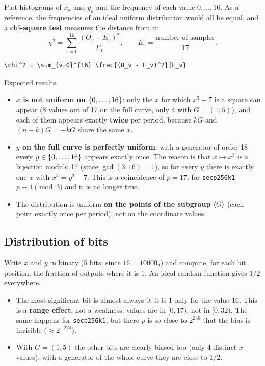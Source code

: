 Plot histograms of $x_k$ and $y_k$ and the frequency of each value $0, \ldots, 16$. As a reference, the frequencies of an ideal uniform distribution would all be equal, and a \textbf{chi-square test} measures the distance from it:
\[
  \chi^2 = \sum_{v=0}^{16} \frac{(O_v - E_v)^2}{E_v}, \qquad E_v = \frac{\text{number of samples}}{17}.
\]
\begin{lstlisting}[numbers=none]
\chi^2 = \sum_{v=0}^{16} \frac{(O_v - E_v)^2}{E_v}\end{lstlisting}

Expected results:
\begin{itemize}
  \item \textbf{$x$ is not uniform on $\left\{0, \ldots, 16\right\}$}: only the $x$ for which $x^3 + 7$ is a square can appear (8 values out of 17 on the full curve, only 4 with $G = (1,5)$), and each of them appears exactly \textbf{twice} per period, because $kG$ and $(n-k)G = -kG$ share the same $x$.
  \item \textbf{$y$ on the full curve is perfectly uniform}: with a generator of order 18 every $y \in \left\{0, \ldots, 16\right\}$ appears exactly once. The reason is that $x \mapsto x^3$ is a bijection modulo 17 (since $\gcd(3, 16) = 1$), so for every $y$ there is exactly one $x$ with $x^3 = y^2 - 7$. This is a coincidence of $p = 17$: for \texttt{secp256k1} $p \equiv 1 \pmod 3$ and it is no longer true.
  \item The distribution is uniform \textbf{on the points of the subgroup} $\left\langle G \right\rangle$ (each point exactly once per period), not on the coordinate values.
\end{itemize}

\subsection{Distribution of bits}

Write $x$ and $y$ in binary (5 bits, since $16 = 10000_2$) and compute, for each bit position, the fraction of outputs where it is 1. An ideal random function gives $1/2$ everywhere.

\begin{itemize}
  \item The most significant bit is almost always 0: it is 1 only for the value 16. This is a \textbf{range effect}, not a weakness: values are in $[0, 17)$, not in $[0, 32)$. The same happens for \texttt{secp256k1}, but there $p$ is so close to $2^{256}$ that the bias is invisible ($\approx 2^{-224}$).
  \item With $G = (1,5)$ the other bits are clearly biased too (only 4 distinct $x$ values); with a generator of the whole curve they are close to $1/2$.
\end{itemize}

